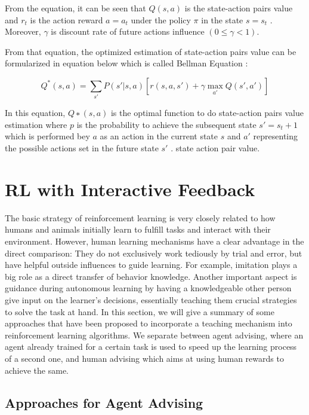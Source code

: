 \documentclass[12pt,twoside]{article}
\theoremstyle{plain}
\theoremstyle{definition}
\theoremstyle{remark}
\begin{document}
From the equation, it can be seen that $Q(s, a)$ is the state-action pairs value and $r_t$ is the action reward $a = a_t$ under the policy $\pi$ in the state $s = s_t$ . Moreover, $\gamma$ is discount rate of future actions influence $(0 \leq \gamma < 1)$. 

From that equation, the optimized estimation of state-action pairs
value can be formularized in equation below which is called Bellman Equation \cite{Sutton1998introduction}:

\begin{equation} \label{eq3}
Q^*(s,a) = \sum_{s'} P(s'|s,a) [r(s,a,s') + \gamma \max_{a'} Q(s',a')]
\end{equation}

In this equation, $Q ∗ (s, a)$ is the optimal function to do state-action pairs value estimation where $p$ is the probability to achieve the subsequent state $s' = s_t+1$ which is performed bey $a$ as an action in the current state $s$ and $a'$ representing the possible actions set in the future state $s'$ \cite{Sutton1998introduction}.
state action pair value.

\section{RL with Interactive Feedback}

The basic strategy of reinforcement learning is very closely related to how humans and animals initially learn to fulfill tasks and interact with their environment. However, human learning mechanisms have a clear advantage in the direct comparison: They do not exclusively work tediously by trial and error, but have helpful outside influences to guide learning. For example, imitation plays a big role as a direct transfer of behavior knowledge. Another important aspect is guidance during autonomous learning by having a knowledgeable other person give input on the learner's decisions, essentially teaching them crucial strategies to solve the task at hand. In this section, we will give a summary of some approaches that have been proposed to incorporate a teaching mechanism into reinforcement learning algorithms. We separate between agent advising, where an agent already trained for a certain task is used to speed up the learning process of a second one, and human advising which aims at using human rewards to achieve the same.

\subsection{Approaches for Agent Advising}
\end{document}
